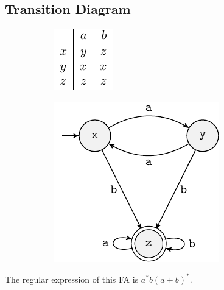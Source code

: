 \subsection{Transition Diagram}
\begin{figure}[h!]
    \centering
    \begin{subfigure}[m]{0.2\textwidth}
        \centering
        \includegraphics[width=\textwidth]{lectures/figures/transition_table.pdf}
    \end{subfigure}
    \begin{subfigure}[m]{0.5\textwidth}
        \centering
        \includegraphics[width=\textwidth]{lectures/figures/transition_diagram.pdf}
    \end{subfigure}
\end{figure}
The regular expression of this FA is \(a^*b(a+b)^*\).

